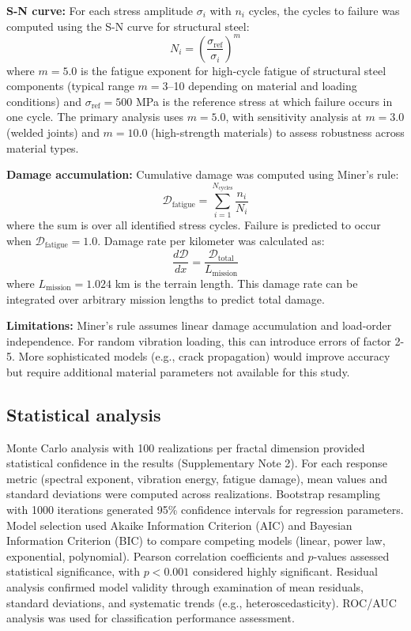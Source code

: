 \documentclass[11pt]{article}
\begin{document}
\textbf{S-N curve:} For each stress amplitude $\sigma_i$ with $n_i$ cycles, the cycles to failure was computed using the S-N curve for structural steel:
\begin{equation}
N_i = \left(\frac{\sigma_{\text{ref}}}{\sigma_i}\right)^m
\end{equation}
where $m = 5.0$ is the fatigue exponent for high-cycle fatigue of structural steel components (typical range $m = 3$--10 depending on material and loading conditions) and $\sigma_{\text{ref}} = 500$ MPa is the reference stress at which failure occurs in one cycle. The primary analysis uses $m = 5.0$, with sensitivity analysis at $m = 3.0$ (welded joints) and $m = 10.0$ (high-strength materials) to assess robustness across material types.

\textbf{Damage accumulation:} Cumulative damage was computed using Miner's rule:
\begin{equation}
\mathcal{D}_{\text{fatigue}} = \sum_{i=1}^{N_{\text{cycles}}} \frac{n_i}{N_i}
\end{equation}
where the sum is over all identified stress cycles. Failure is predicted to occur when $\mathcal{D}_{\text{fatigue}} = 1.0$. Damage rate per kilometer was calculated as:
\begin{equation}
\frac{d\mathcal{D}}{dx} = \frac{\mathcal{D}_{\text{total}}}{L_{\text{mission}}}
\end{equation}
where $L_{\text{mission}} = 1.024$ km is the terrain length. This damage rate can be integrated over arbitrary mission lengths to predict total damage.

\textbf{Limitations:} Miner's rule assumes linear damage accumulation and load-order independence. For random vibration loading, this can introduce errors of factor 2-5. More sophisticated models (e.g., crack propagation) would improve accuracy but require additional material parameters not available for this study.

\subsection*{Statistical analysis}

Monte Carlo analysis with 100 realizations per fractal dimension provided statistical confidence in the results (Supplementary Note 2). For each response metric (spectral exponent, vibration energy, fatigue damage), mean values and standard deviations were computed across realizations. Bootstrap resampling with 1000 iterations generated 95\% confidence intervals for regression parameters\cite{Efron1993}. Model selection used Akaike Information Criterion (AIC) and Bayesian Information Criterion (BIC) to compare competing models (linear, power law, exponential, polynomial). Pearson correlation coefficients and $p$-values assessed statistical significance, with $p < 0.001$ considered highly significant. Residual analysis confirmed model validity through examination of mean residuals, standard deviations, and systematic trends (e.g., heteroscedasticity). ROC/AUC analysis\cite{Fawcett2006} was used for classification performance assessment.
\end{document}
